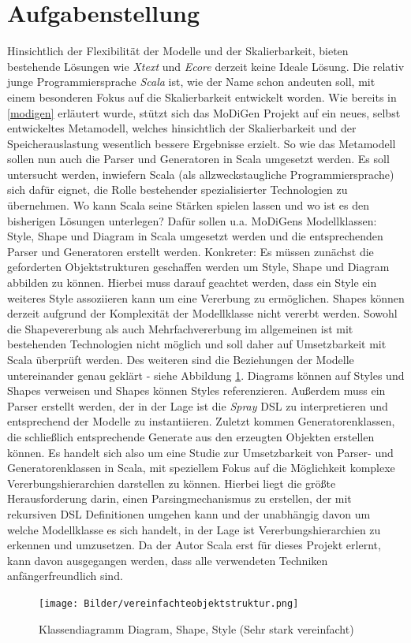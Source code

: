 \section{Aufgabenstellung}
Hinsichtlich der Flexibilität der Modelle und der Skalierbarkeit, bieten bestehende Lösungen wie \textit{Xtext} und \textit{Ecore} derzeit keine Ideale Lösung. Die relativ junge Programmiersprache \textit{Scala} ist, wie der Name schon andeuten soll, mit einem besonderen Fokus auf die Skalierbarkeit entwickelt worden. Wie bereits in \ref{modigen} erläutert wurde, stützt sich das MoDiGen Projekt auf ein neues, selbst entwickeltes Metamodell, welches hinsichtlich der Skalierbarkeit und der Speicherauslastung wesentlich bessere Ergebnisse erzielt. So wie das Metamodell sollen nun auch die Parser und Generatoren in Scala umgesetzt werden. Es soll untersucht werden, inwiefern Scala (als allzweckstaugliche Programmiersprache) sich dafür eignet, die Rolle bestehender spezialisierter Technologien zu übernehmen. Wo kann Scala seine Stärken spielen lassen und wo ist es den bisherigen Lösungen unterlegen? Dafür sollen u.a. MoDiGens Modellklassen: Style, Shape und Diagram in Scala umgesetzt werden und die entsprechenden Parser und Generatoren erstellt werden. Konkreter: Es müssen zunächst die geforderten Objektstrukturen geschaffen werden um Style, Shape und Diagram abbilden zu können. Hierbei muss darauf geachtet werden, dass ein Style ein weiteres Style assoziieren kann um eine Vererbung zu ermöglichen. Shapes können derzeit aufgrund der Komplexität der Modellklasse nicht vererbt werden. Sowohl die Shapevererbung als auch Mehrfachvererbung im allgemeinen ist mit bestehenden Technologien nicht möglich und soll daher auf Umsetzbarkeit mit Scala überprüft werden. Des weiteren sind die Beziehungen der Modelle untereinander genau geklärt - siehe Abbildung \ref{diagramshapestyle}.
Diagrams können auf Styles und Shapes verweisen und Shapes können Styles referenzieren. Außerdem muss ein Parser erstellt werden, der in der Lage ist die \textit{Spray} DSL zu interpretieren und entsprechend der Modelle zu instantiieren. Zuletzt kommen Generatorenklassen, die schließlich entsprechende Generate aus den erzeugten Objekten erstellen können. Es handelt sich also um eine Studie zur Umsetzbarkeit von Parser- und Generatorenklassen in Scala, mit speziellem Fokus auf die Möglichkeit komplexe Vererbungshierarchien darstellen zu können. Hierbei liegt die größte Herausforderung darin, einen Parsingmechanismus zu erstellen, der mit rekursiven DSL Definitionen umgehen kann und der unabhängig davon um welche Modellklasse es sich handelt, in der Lage ist Vererbungshierarchien zu erkennen und umzusetzen. Da der Autor Scala erst für dieses Projekt erlernt, kann davon ausgegangen werden, dass alle verwendeten Techniken anfängerfreundlich sind.
\begin{figure}[h]
\begin{center}
\texttt{[image: Bilder/vereinfachteobjektstruktur.png]}
\caption{Klassendiagramm Diagram, Shape, Style (Sehr stark vereinfacht)}
\label{diagramshapestyle}
\end{center}
\end{figure}